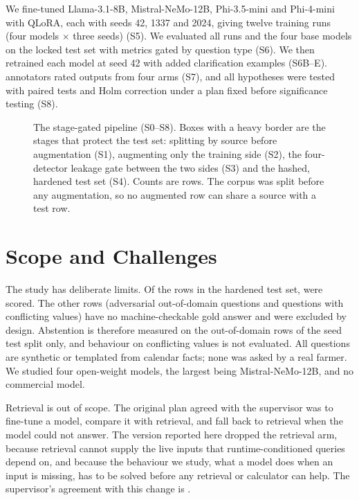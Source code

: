 We fine-tuned Llama-3.1-8B, Mistral-NeMo-12B, Phi-3.5-mini and Phi-4-mini with QLoRA, each with seeds 42, 1337 and 2024, giving twelve training runs (four models $\times$ three seeds) (S5). We evaluated all runs and the four base models on the locked test set with metrics gated by question type (S6). We then retrained each model at seed 42 with \ClarifyTrainRows added clarification examples (S6B--E). \HumAnnotators annotators rated \HumUniqueOutputs outputs from four arms (S7), and all hypotheses were tested with paired tests and Holm correction under a plan fixed before significance testing (S8).

\begin{figure}[tbp]
  \centering
  \resizebox{\textwidth}{!}{}
  \caption{The stage-gated pipeline (S0--S8). Boxes with a heavy border are the stages that protect the test set: splitting by source before augmentation (S1), augmenting only the training side (S2), the four-detector leakage gate between the two sides (S3) and the hashed, hardened test set (S4). Counts are rows. The corpus was split before any augmentation, so no augmented row can share a source with a test row.}
  \label{fig:pipeline}
\end{figure}

\section{Scope and Challenges}
\label{sec:scope}

The study has deliberate limits. Of the \TestRows rows in the hardened test set, \TestScorable were scored. The other \TestExcluded rows (\TestExcludedOOD adversarial out-of-domain questions and \TestExcludedConflict questions with conflicting values) have no machine-checkable gold answer and were excluded by design. Abstention is therefore measured on the \TestAbstain out-of-domain rows of the seed test split only, and behaviour on conflicting values is not evaluated. All questions are synthetic or templated from calendar facts; none was asked by a real farmer. We studied four open-weight models, the largest being Mistral-NeMo-12B, and no commercial model.

Retrieval is out of scope. The original plan agreed with the supervisor was to fine-tune a model, compare it with retrieval, and fall back to retrieval when the model could not answer. The version reported here dropped the retrieval arm, because retrieval cannot supply the live inputs that runtime-conditioned queries depend on, and because the behaviour we study, what a model does when an input is missing, has to be solved before any retrieval or calculator can help. The supervisor's agreement with this change is .


